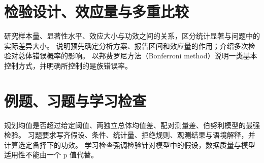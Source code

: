\section{检验设计、效应量与多重比较}
\label{sec:ps-power-multiplicity}
研究样本量、显著性水平、效应大小与功效之间的关系，区分统计显著与问题中的实际差异大小。
说明预先确定分析方案、报告区间和效应量的作用；介绍多次检验对总体错误概率的影响。
以邦费罗尼方法（Bonferroni method）说明一类基本控制方式，并明确所控制的是族错误率。

\section{例题、习题与学习检查}
规划均值是否超过给定阈值、两独立总体均值差、配对测量差、伯努利模型的最强检验。
习题要求写齐假设、条件、统计量、拒绝规则、观测结果与语境解释，并计算选定备择下的功效。
学习检查强调检验针对模型中的假设，数据质量与模型适用性不能由一个 p 值代替。






